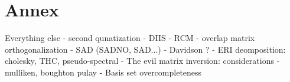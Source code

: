 \chapter{Annex}

Everything else
- second qunatization
- DIIS 
- RCM
- overlap matrix orthogonalization
- SAD (SADNO, SAD...)
- Davidson ? 
- ERI deomposition: cholesky, THC, pseudo-spectral
- The evil matrix inversion: considerations
- mulliken, boughton pulay
- Basis set overcompleteness